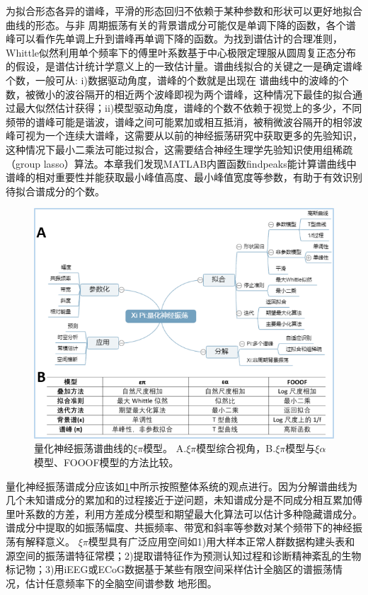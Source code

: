 为拟合形态各异的谱峰，平滑的形态回归不依赖于某种参数和形状可以更好地拟合曲线的形态。与非
周期振荡有关的背景谱成分可能仅是单调下降的函数，各个谱峰可以看作先单调上升到谱峰再单调下降的函数。为找到谱估计的合理准则，Whittle似然利用单个频率下的傅里叶系数基于中心极限定理服从圆周复正态分布的假设，是谱估计统计学意义上的一致估计量。谱曲线拟合的关键之一是确定谱峰个数，一般可从: i)数据驱动角度，谱峰的个数就是出现在
谱曲线中的波峰的个数，被微小的波谷隔开的相近两个波峰即视为两个谱峰，这种情况下最佳的拟合通过最大似然估计获得；ii)模型驱动角度，谱峰的个数不依赖于视觉上的多少，不同频带的谱峰可能是谐波，谱峰之间可能累加或相互抵消，被稍微波谷隔开的相邻波峰可视为一个连续大谱峰，这需要从以前的神经振荡研究中获取更多的先验知识，这种情况下最小二乘法可能过拟合，这需要结合神经生理学先验知识使用组稀疏（group lasso）算法。本章我们发现MATLAB内置函数findpeaks能计算谱曲线中谱峰的相对重要性并能获取最小峰值高度、最小峰值宽度等参数，有助于有效识别待拟合谱成分的个数。

\begin{figure}[!h]
\includegraphics[width=15cm]{pic/xipi/model.png}
\caption{量化神经振荡谱曲线的$\xi\pi$模型。 A.$\xi\pi$模型综合视角，B.$\xi\pi$模型与$\xi\alpha$模型、FOOOF模型的方法比较。}
\label{7:model}
\end{figure}

量化神经振荡谱成分应该如\ref{7:model}中所示按照整体系统的观点进行。因为分解谱曲线为几个未知谱成分的累加和的过程接近于逆问题，未知谱成分是不同成分相互累加傅里叶系数的方差，利用方差成分模型和期望最大化算法可以估计多种隐藏谱成分。谱成分中提取的如振荡幅度、共振频率、带宽和斜率等参数对某个频带下的神经振荡有解释意义。
$\xi\pi$模型具有广泛应用空间如1)用大样本正常人群数据构建头表和源空间的振荡谱特征常模；2)提取谱特征作为预测认知过程和诊断精神紊乱的生物标记物；3)用iEEG或ECoG数据基于某些有限空间采样估计全脑区的谱振荡情况，估计任意频率下的全脑空间谱参数
地形图。

